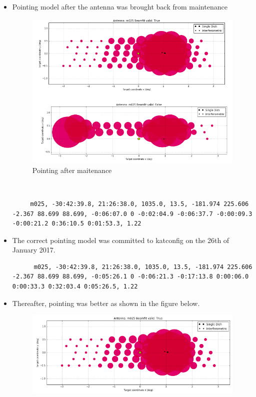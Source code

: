 \documentclass{article}
\begin{document}
{\begin{appendices}
\begin{itemize}
	 \item Pointing model after the antenna was brought back from maintenance
	  \begin{figure}[H]
	  	\centering
	  	\includegraphics[scale=0.33]{m025_after2.png}
	  	
	  	\caption{Pointing after maitenance}
	  	\label{fig:tilt7}
	  \end{figure}
  \begin{lstlisting}
  
  \end{lstlisting}
	  \begin{verbatim}
	 m025, -30:42:39.8, 21:26:38.0, 1035.0, 13.5, -181.974 225.606 -2.367 88.699 88.699, -0:06:07.0 0 -0:02:04.9 -0:06:37.7 -0:00:09.3 -0:00:21.2 0:36:10.5 0:01:53.3, 1.22
	  \end{verbatim}
	  
	  \item The correct pointing model was committed to katconfig on the 26th of January 2017. 
	  \begin{lstlisting}
	  m025, -30:42:39.8, 21:26:38.0, 1035.0, 13.5, -181.974 225.606 -2.367 88.699 88.699, -0:05:26.1 0 -0:06:21.3 -0:17:13.8 0:00:06.0 0:00:33.3 0:32:03.4 0:05:26.5, 1.22
	  \end{lstlisting}
	  
	  
	  
	  \item Thereafter, pointing was better as shown in the figure below.
	  
	 \begin{figure}[H]
	 	\centering
	 	\includegraphics[scale=0.33]{m025_after.png}
	 	

\end{figure}
\end{itemize}
\end{appendices}}
\end{document}
